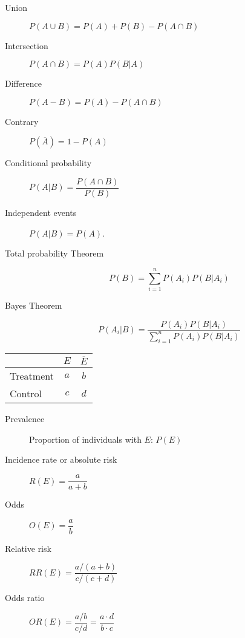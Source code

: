\begin{multicols*}{2}
\begin{tcolorbox}[hbox, title=Basic probability]
\begin{minipage}{0.4\textwidth}
\begin{description}
\item [Union] $P(A\cup B)=P(A)+P(B)-P(A\cap B)$
\item [Intersection] $P(A\cap B)=P(A)P(B|A)$
\item [Difference] $P(A-B)=P(A)-P(A\cap B)$
\item [Contrary] $P(\overline{A})=1-P(A)$
\end{description}
\end{minipage}
\end{tcolorbox}

\begin{tcolorbox}[hbox, title=Conditional probability]
\begin{minipage}{0.4\textwidth}
\begin{description}
\item [Conditional probability] $P(A|B)=\dfrac{P(A\cap B)}{P(B)}$
\item [Independent events] $P(A|B)=P(A)$.
\item [Total probability Theorem] \[P(B)=\sum_{i=1}^n P(A_i)P(B|A_i)\]
\item [Bayes Theorem] \[P(A_i|B)=\dfrac{P(A_i)P(B|A_i)}{\sum_{i=1}^n P(A_i)P(B|A_i)}\]
\end{description}
\end{minipage}
\end{tcolorbox}


\begin{tcolorbox}[hbox, title=Risks]
\begin{minipage}{0.4\textwidth}
\begin{center}
\begin{tabular}{|l|c|c|}
\cline{2-3}
\multicolumn{1}{c|}{} & $E$ & $\overline E$ \\
\hline
Treatment             & $a$ & $b$           \\
\hline
Control               & $c$ & $d$           \\
\hline
\end{tabular}
\end{center}
\begin{description}
\item[Prevalence] Proportion of individuals with $E$: $P(E)$
\item[Incidence rate or absolute risk] $R(E)=\dfrac{a}{a+b}$
\item[Odds] $O(E)=\dfrac{a}{b}$
\item[Relative risk] $RR(E)=\dfrac{a/(a+b)}{c/(c+d)}$
\item[Odds ratio] $OR(E)=\dfrac{a/b}{c/d}=\dfrac{a\cdot d}{b\cdot c}$
\end{description}
\end{minipage}
\end{tcolorbox}



\end{multicols*}
